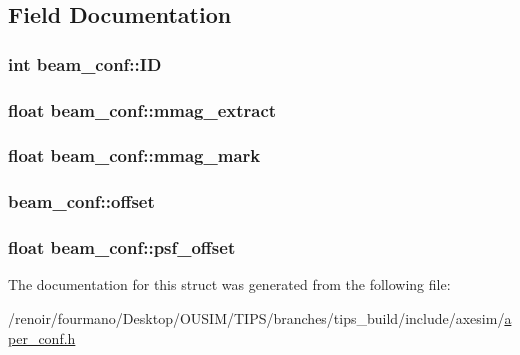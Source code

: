\subsection{Field Documentation}
\hypertarget{structbeam__conf_a240d13d3f0a07ee411bce6c41b590b5b}{
\subsubsection[{ID}]{\setlength{\rightskip}{0pt plus 5cm}int {\bf beam\_\-conf::ID}}}
\label{structbeam__conf_a240d13d3f0a07ee411bce6c41b590b5b}
\hypertarget{structbeam__conf_adfafb08dec01127a7c09ec3dab7729b1}{
\subsubsection[{mmag\_\-extract}]{\setlength{\rightskip}{0pt plus 5cm}float {\bf beam\_\-conf::mmag\_\-extract}}}
\label{structbeam__conf_adfafb08dec01127a7c09ec3dab7729b1}
\hypertarget{structbeam__conf_a2d2357691589e58e4e50eb9fe9bbf199}{
\subsubsection[{mmag\_\-mark}]{\setlength{\rightskip}{0pt plus 5cm}float {\bf beam\_\-conf::mmag\_\-mark}}}
\label{structbeam__conf_a2d2357691589e58e4e50eb9fe9bbf199}
\hypertarget{structbeam__conf_a55f5257b40a3f5f6b43980c779734e84}{
\subsubsection[{offset}]{ {\bf beam\_\-conf::offset}}}
\label{structbeam__conf_a55f5257b40a3f5f6b43980c779734e84}
\hypertarget{structbeam__conf_a4ef1405baadd6ba9013e444a2001ed60}{
\subsubsection[{psf\_\-offset}]{\setlength{\rightskip}{0pt plus 5cm}float {\bf beam\_\-conf::psf\_\-offset}}}
\label{structbeam__conf_a4ef1405baadd6ba9013e444a2001ed60}


The documentation for this struct was generated from the following file:\begin{DoxyCompactItemize}
\item 
/renoir/fourmano/Desktop/OUSIM/TIPS/branches/tips\_\-build/include/axesim/\hyperlink{aper__conf_8h}{aper\_\-conf.h}\end{DoxyCompactItemize}
